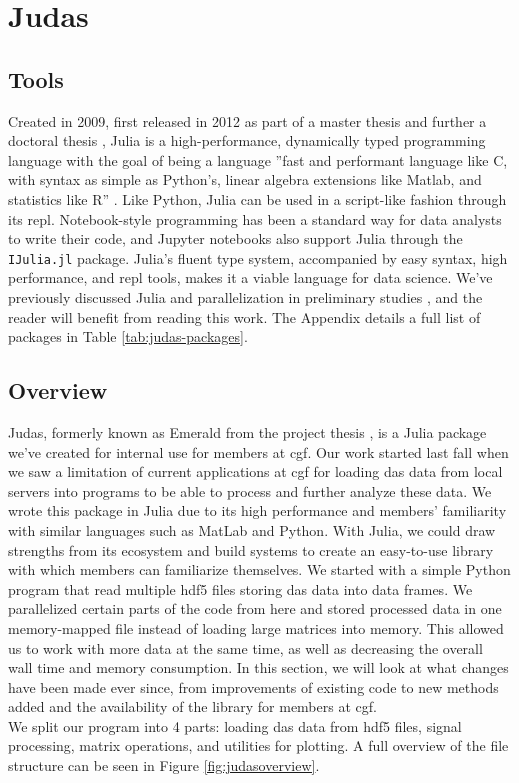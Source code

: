 \section{Judas}
\label{met:Judas}

\subsection{Tools}
\label{met:Julia}

Created in 2009, first released in 2012 as part of a master thesis \cite{juliaMs} and further a doctoral thesis \cite{juliaPHD}, Julia is a high-performance, dynamically typed programming language with the goal of being a language ''fast and performant language like C, with syntax as simple as Python's, linear algebra extensions like Matlab, and statistics like R'' \cite{julia}. Like Python, Julia can be used in a script-like fashion through its \acrfull{repl}. Notebook-style programming has been a standard way for data analysts to write their code, and Jupyter notebooks also support Julia through the \texttt{IJulia.jl} package. Julia's fluent type system, accompanied by easy syntax, high performance, and \acrshort{repl} tools, makes it a viable language for data science. We've previously discussed Julia and parallelization in preliminary studies \cite{projthesis}, and the reader will benefit from reading this work. The Appendix details a full list of packages in Table \ref{tab:judas-packages}.

\subsection{Overview}
\label{met:judasoverview}

Judas, formerly known as Emerald from the project thesis \cite{projthesis}, is a Julia package we've created for internal use for members at \acrshort{cgf}. Our work started last fall when we saw a limitation of current applications at \acrshort{cgf} for loading \acrshort{das} data from local servers into programs to be able to process and further analyze these data. We wrote this package in Julia due to its high performance and members' familiarity with similar languages such as MatLab and Python. With Julia, we could draw strengths from its ecosystem and build systems to create an easy-to-use library with which members can familiarize themselves. We started with a simple Python program that read multiple \acrshort{hdf5} files storing \acrshort{das} data into data frames. We parallelized certain parts of the code from here and stored processed data in one memory-mapped file instead of loading large matrices into memory. This allowed us to work with more data at the same time, as well as decreasing the overall wall time and memory consumption.  
In this section, we will look at what changes have been made ever since, from improvements of existing code to new methods added and the availability of the library for members at \acrshort{cgf}. \\
We split our program into 4 parts: loading \acrshort{das} data from \acrshort{hdf5} files, signal processing, matrix operations, and utilities for plotting. A full overview of the file structure can be seen in Figure \ref{fig:judasoverview}.\\

